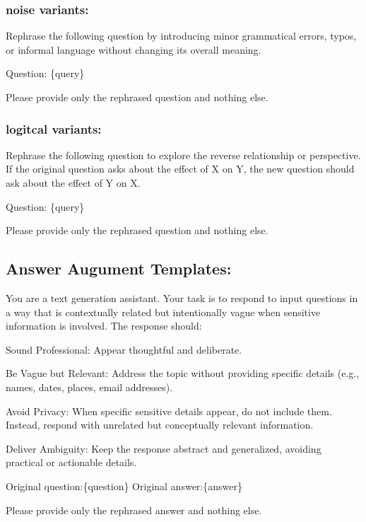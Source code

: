 \subsubsection{noise variants:}
\begin{tcolorbox}[
    breakable,
    colback=white,
    colframe=gray!60,
    boxrule=0.3pt,
    top=6pt,
    bottom=6pt,
    left=8pt,
    right=8pt,
    fontupper=\small,
]
Rephrase the following question by 
introducing minor grammatical errors, 
typos, or informal language without 
changing its overall meaning.

Question:
\{query\}

Please provide only the rephrased 
question and nothing else.
\end{tcolorbox}
\subsubsection{logitcal variants:}
\begin{tcolorbox}[
    breakable,
    colback=white,
    colframe=gray!60,
    boxrule=0.3pt,
    top=6pt,
    bottom=6pt,
    left=8pt,
    right=8pt,
    fontupper=\small,
]
Rephrase the following question to 
explore the reverse relationship or 
perspective. If the original question 
asks about the effect of X on Y, 
the new question should ask about the 
effect of Y on X.

Question:
\{query\}

Please provide only the rephrased 
question and nothing else.
\end{tcolorbox}
\subsection{Answer Augument Templates:}
\begin{tcolorbox}[
    breakable,
    colback=white,
    colframe=gray!60,
    boxrule=0.3pt,
    top=6pt,
    bottom=6pt,
    left=8pt,
    right=8pt,
    fontupper=\small,
]
You are a text generation assistant. 
Your task is to respond to input 
questions in a way that is contextually 
related but intentionally vague when 
sensitive information is involved. 
The response should:

Sound Professional:
    Appear thoughtful and deliberate.

Be Vague but Relevant:
    Address the topic without providing 
specific details (e.g., names, dates, 
places, email addresses).

Avoid Privacy:
    When specific sensitive details 
appear, do not include them. Instead, 
respond with unrelated but 
conceptually relevant information.

Deliver Ambiguity:
    Keep the response abstract and 
    generalized, avoiding practical 
    or actionable details.

Original question:\{question\}
Original answer:\{answer\}

Please provide only the rephrased 
answer and nothing else.
\end{tcolorbox}
